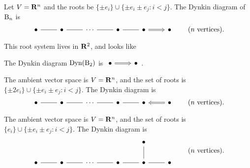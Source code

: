 \begin{example}
Let $V=\mathbf{R}^n$ and the roots be $\{\pm e_i\}\cup \{\pm e_i\pm e_j:i<j\}$. The 
Dynkin diagram of $\mathrm{B}_n$ is 
\[
\begin{tikzcd}
  \bullet \ar[r, dash] 
    & \bullet \ar[r, dash] 
    & \cdots \ar[r, dash] 
    & \bullet \ar[r, dash] 
    & \bullet \ar[r, Rightarrow] 
    & \bullet 
\end{tikzcd}
\qquad\text{($n$ vertices)} .
\]
\end{example}

\begin{example}
This root system lives in $\mathbf{R}^2$, and looks like 
\begin{center}
\end{center}
The Dynkin diagram $\operatorname{Dyn}(\mathrm{B}_2)$ is 
$\begin{tikzcd}\bullet \ar[r, Rightarrow] & \bullet \end{tikzcd}$. 
\end{example}

\begin{example}
The ambient vector space is $V=\mathbf{R}^n$, and the set of roots is 
$\{\pm 2e_i\}\cup \{\pm e_i\pm e_j:i<j\}$. The Dynkin diagram is 
\[
\begin{tikzcd}
  \bullet \ar[r, dash] 
    & \bullet \ar[r, dash] 
    & \cdots \ar[r, dash] 
    & \bullet \ar[r, dash] 
    & \bullet \ar[r, Leftarrow] 
    & \bullet 
\end{tikzcd}
\qquad\text{($n$ vertices)} .
\]
\end{example}

\begin{example}
The ambient vector space is $V=\mathbf{R}^n$, and the set of roots is 
$\{e_i\}\cup \{\pm e_i\pm e_j:i<j\}$. The Dynkin diagram is 
\[
\begin{tikzcd}
  & & & & \bullet \\
  \bullet \ar[r, dash]
    & \bullet \ar[r, dash] 
    & \cdots \ar[r, dash]
    & \bullet \ar[r, dash]
    & \bullet \ar[r, dash] \ar[u, dash] 
    & \bullet
\end{tikzcd}
\qquad\text{($n$ vertices)} .
\]
\end{example}

